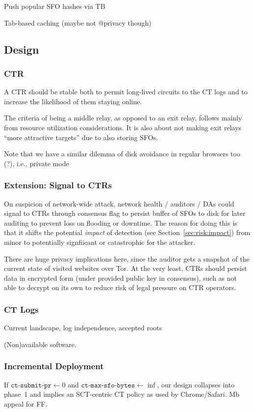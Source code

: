 Push popular SFO hashes via TB

Tab-based caching (maybe not @privacy though)

\subsection{Design}

\subsubsection{CTR}
A CTR should be stable both to permit long-lived circuits to the CT logs and
to increase the likelihood of them staying online.

The criteria of being a middle relay, as opposed to an exit relay, follows
mainly from resource utilization considerations.  It is also about not making
exit relays ``more attractive targets'' due to also storing SFOs.

Note that we have a similar dilemma of disk avoidance in regular browsers too
(?), i.e., private mode

\subsubsection{Extension: Signal to CTRs}
On suspicion of network-wide attack, network health / auditors / DAs could
signal to CTRs through consensus flag to persist buffer of SFOs to disk for
later auditing to prevent loss on flooding or downtime. The reason for doing
this is that it shifts the potential \emph{impact} of detection (see
Section~\ref{sec:risk:impact}) from minor to potentially signfiicant or
catastrophic for the attacker.

There are huge privacy implications here, since the auditor gets a snapshot of
the current state of visited websites over Tor. At the very least, CTRs should
persist data in encrypted form (under provided public key in consensus), such as
not able to decrypt on its own to reduce risk of legal pressure on CTR
operators.

\subsubsection{CT Logs} \label{sec:discussion:logs}
Current landscape, log independence, accepted roots~\cite{ct-root-landscape}

(Non)available software.

\subsubsection{Incremental Deployment}
If $\texttt{ct-submit-pr} \gets 0$ and $\texttt{ct-max-sfo-bytes} \gets
\inf$, our design collapses into phase~1 and implies an SCT-centric CT policy
as used by Chrome/Safari.  Mb appeal for FF.

